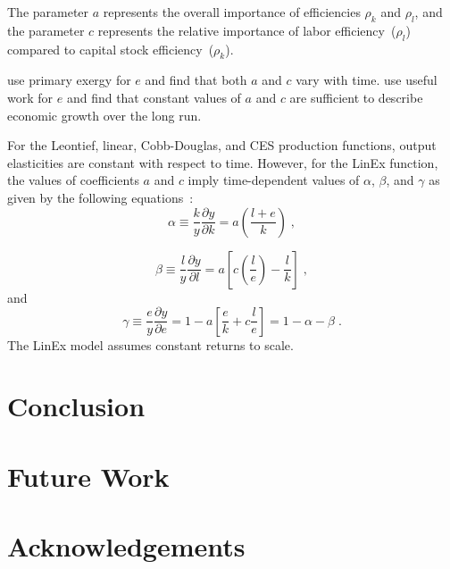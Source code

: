 \documentclass[preprint,authoryear,12pt]{elsarticle}
\begin{document}
The parameter $a$ represents the overall importance of efficiencies $\rho_k$ and $\rho_l$, 
and the parameter $c$ represents the relative importance 
of labor efficiency~($\rho_l$) compared to capital stock efficiency~($\rho_k$). 

\citet{Kummel:2010vz} use primary exergy for $e$ and find that 
both $a$ and $c$ vary with time.
\citet{Warr:2012cg} use useful work for $e$ and find that 
constant values of $a$ and $c$ are sufficient to describe economic growth 
over the long run. 

For the Leontief, linear, Cobb-Douglas, and CES production functions, 
output elasticities are constant with respect to time.
However, for the LinEx function, 
the values of coefficients $a$ and $c$ imply time-dependent
values of $\alpha$, $\beta$, and $\gamma$ as given by the following equations~\citep{Warr:2012cg}:
%
\begin{equation} \label{eq:LINEX_alpha}
  \alpha \equiv \frac{k}{y}\frac{\partial y}{\partial k} = a \left( \frac{l + e}{k} \right) \;,
\end{equation}

\begin{equation} \label{eq:LINEX_beta}
  \beta \equiv \frac{l}{y} \frac{\partial y}{\partial l} = a \left[ c \left( \frac{l}{e}\right) - \frac{l}{k} \right] \;,
\end{equation}
%
\noindent{}and
%
\begin{equation} \label{eq:LINEX_beta_2}
  \gamma \equiv \frac{e}{y} \frac{\partial y}{\partial e} 
         = 1 - a \left[ \frac{e}{k} + c \frac{l}{e} \right] 
         = 1 - \alpha - \beta \;.
\end{equation}
%
The LinEx model assumes constant returns to scale.


\section{Conclusion}
\label{sec:Conclusion}


\section{Future Work}
\label{sec:FutureWork}




\section*{Acknowledgements}
\label{sec:Acknowledgements}
\end{document}
